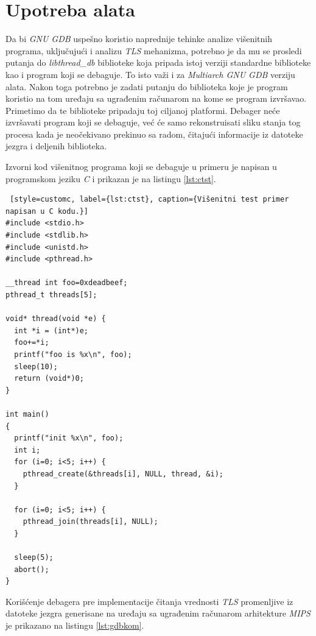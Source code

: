 \documentclass[12pt,oneside]{memoir}
\begin{document}
\section{Upotreba alata}

Da bi \emph{GNU GDB} uspešno koristio naprednije tehinke analize višenitnih programa, uključujući i analizu \emph{TLS} mehanizma, potrebno je da mu se prosledi putanja do \emph{libthread\_db} biblioteke koja pripada istoj verziji standardne biblioteke kao i program koji se debaguje. To isto važi i za \emph{Multiarch GNU GDB} verziju alata. Nakon toga potrebno je zadati putanju do biblioteka koje je program koristio na tom uređaju sa ugrađenim računarom na kome se program izvršavao. Primetimo da te biblioteke pripadaju toj ciljanoj platformi. Debager neće izvršavati program koji se debaguje, već će samo rekonstruisati sliku stanja tog procesa kada je neočekivano prekinuo sa radom, čitajući informacije iz datoteke jezgra i deljenih biblioteka.


Izvorni kod višenitnog programa koji se debaguje u primeru je napisan u programskom jeziku \emph{C} i prikazan je na listingu \ref{lst:ctst}.\newpage

\begin{lstlisting} [style=customc, label={lst:ctst}, caption={Višenitni test primer napisan u C kodu.}]
#include <stdio.h>
#include <stdlib.h>
#include <unistd.h>
#include <pthread.h>

__thread int foo=0xdeadbeef;
pthread_t threads[5];

void* thread(void *e) {
  int *i = (int*)e;
  foo+=*i;
  printf("foo is %x\n", foo);
  sleep(10);
  return (void*)0;
}   

int main()
{
  printf("init %x\n", foo);
  int i;
  for (i=0; i<5; i++) {
    pthread_create(&threads[i], NULL, thread, &i);
  }

  for (i=0; i<5; i++) {
    pthread_join(threads[i], NULL);
  }

  sleep(5);
  abort();
}

\end{lstlisting}

Korišćenje debagera pre implementacije čitanja vrednosti \emph{TLS} promenljive iz datoteke jezgra generisane na uređaju sa ugrađenim računarom arhitekture \emph{MIPS} je prikazano na listingu \ref{lst:gdbkom}.\newpage
\end{document}
